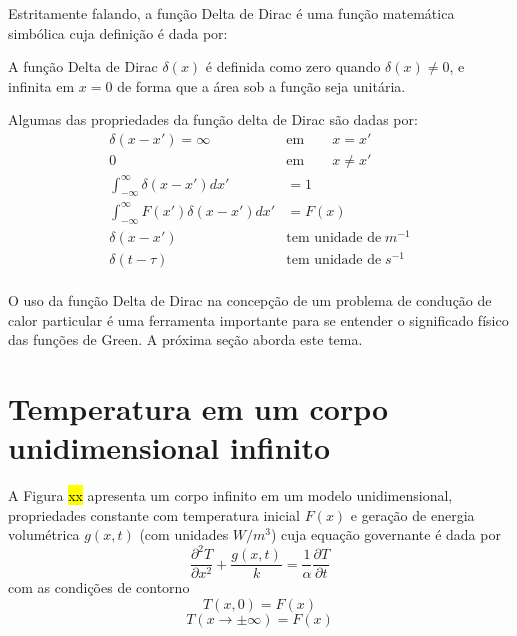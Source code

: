 Estritamente falando, a função Delta de Dirac é uma função matemática simbólica cuja definição é dada por:

A função Delta de Dirac $\delta (x)$ é definida como zero quando $\delta (x)\neq 0$, e infinita em $x = 0$ de forma que a área sob a função seja unitária.

Algumas das propriedades da função delta de Dirac são dadas por:
\begin{equation*}
    \begin{split}
        \delta(x-x') =  \infty  \qquad & \text{em}  \qquad x = x' \\
        0 \qquad  & \text{em}  \qquad x \neq x'\\ 
        \displaystyle \int_{-\infty}^{\infty} \delta(x-x') dx' & =  1 \\  
        \displaystyle \int_{-\infty}^{\infty} F(x') \delta(x-x') dx' & = F(x) \\  
        \delta(x-x') \qquad & \text{tem unidade de} \; m^{-1} \\ 
        \delta(t-\tau) \qquad & \text{tem unidade de} \; s^{-1} \\
    \end{split}
\end{equation*}

O uso da função Delta de Dirac na concepção de um problema de condução de calor particular é uma ferramenta importante para se entender o significado físico das funções de Green.  A próxima seção aborda este tema.

\section{Temperatura em um corpo unidimensional infinito}
A Figura \hl{xx} apresenta um corpo infinito em um modelo unidimensional, propriedades constante com temperatura inicial $F(x)$ e geração de energia volumétrica $g(x,t)$ (com unidades $W/m^3$) cuja equação governante é dada por
\begin{equation}\label{eq1Da}
    \frac{\partial^2 T}{\partial x^2} + \frac{g(x,t)}{k}  
    = \frac{1}{\alpha}\frac{\partial T}{\partial t}  
\end{equation}
com as condições de contorno 
\begin{equation}\label{eq1Db}
    T(x,0) = F(x)
\end{equation}
\begin{equation}\label{eq1Dc}
    T(x\rightarrow  \pm \infty) = F(x)
\end{equation}

